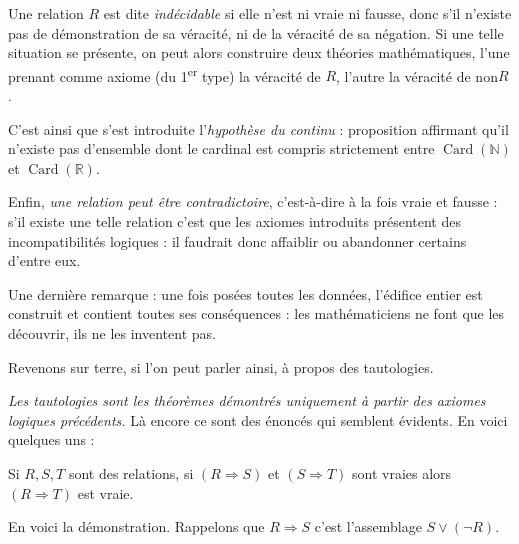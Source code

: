 Une relation $R$ est dite \emph{indécidable} si elle n'est ni vraie ni fausse, donc s'il n'existe pas de démonstration de sa véracité, ni de la véracité de sa négation. Si une telle situation se présente, on peut alors construire deux théories mathématiques, l'une prenant comme axiome (du 1\textsuperscript{er} type) la véracité de $R$, l'autre la véracité de non$R$.

C'est ainsi que s'est introduite l'\emph{hypothèse du continu} : proposition affirmant qu'il n'existe pas d'ensemble dont le cardinal est compris strictement entre $\operatorname{Card}(\mathbb N)$ et $\operatorname{Card}(\mathbb R)$.


Enfin, \emph{une relation peut être contradictoire}, c'est-à-dire à la fois vraie et fausse : s'il existe une telle relation c'est que les axiomes introduits présentent des incompatibilités logiques : il faudrait donc affaiblir ou abandonner certains d'entre eux.

Une dernière remarque : une fois posées toutes les données, l'édifice entier est construit et contient toutes ses conséquences : les mathématiciens ne font que les découvrir, ils ne les inventent pas.

Revenons sur terre, si l'on peut parler ainsi, à propos des tautologies.

\emph{Les tautologies sont les théorèmes démontrés uniquement à partir des axiomes logiques précédents.} Là encore ce sont des énoncés qui semblent évidents. En voici quelques uns :

\begin{description}[leftmargin=4em,labelwidth=3.4em,labelsep=.6em,font=\itshape]
\item[(TL1)] Si $R,S,T$ sont des relations, si $(R\Rightarrow S)$ et $(S\Rightarrow T)$ sont vraies alors $(R\Rightarrow T)$ est vraie.
\end{description}
En voici la démonstration. Rappelons que $R\Rightarrow S$ c'est l'assemblage $S\lor(\neg R)$.

